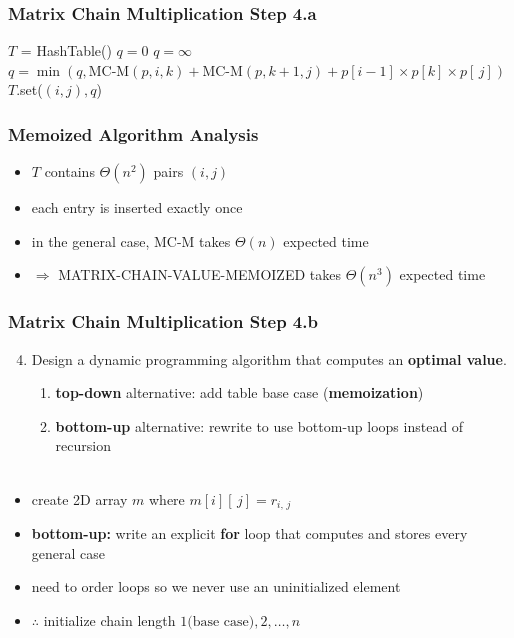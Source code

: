 \documentclass[10pt,aspectratio=169]{beamer}
\newcommand{\stanza}{ \\~\ }
\begin{document}
\begin{frame} \frametitle{Matrix Chain Multiplication Step 4.a}
  {\scriptsize
  \begin{algorithmic}[1]
    \State $T$ = HashTable()
    \State {}
    \EndFunction
      \State {}
    \EndIf
      \State $q=0$
    \Else
      \State $q = \infty$
        \State $q = \min(q, \text{MC-M}(p, i, k) + \text{MC-M}(p, k+1, j)+ p[i-1] \times p[k] \times p[\, j])$
      \EndFor
    \EndIf
    \State $T$.set($(i, j), q$)
    \State {}
    \EndFunction
  \end{algorithmic}
  }
\end{frame}

\begin{frame} \frametitle{Memoized Algorithm Analysis}
  \begin{itemize}
    \item $T$ contains $\Theta(n^2)$ pairs $(i, j)$
    \item each entry is inserted exactly once
    \item in the general case, MC-M takes $\Theta(n)$ expected time
    \item $\Rightarrow$ MATRIX-CHAIN-VALUE-MEMOIZED takes $\Theta(n^3)$ expected time
  \end{itemize}
\end{frame}

\begin{frame} \frametitle{Matrix Chain Multiplication Step 4.b}
  \begin{enumerate}
    \setcounter{enumi}{3}
    \item Design a dynamic programming algorithm that computes an \textbf{optimal value}.
    \begin{enumerate}
      \item \textbf{top-down} alternative: add table base case (\textbf{memoization})
      \item \textbf{bottom-up} alternative: rewrite to use bottom-up loops instead of recursion
      \stanza
    \end{enumerate}
\end{enumerate}

\begin{itemize}
  \item create 2D array $m$ where $m[i][\, j] = r_{i, \, j}$
  \item \textbf{bottom-up:} write an explicit \textbf{for} loop that computes and stores every general case
  \item need to order loops so we never use an uninitialized element
  \item $\therefore$ initialize chain length $1 \text{(base case)}, 2, \ldots, n$
\end{itemize}
\end{frame}
\end{document}
